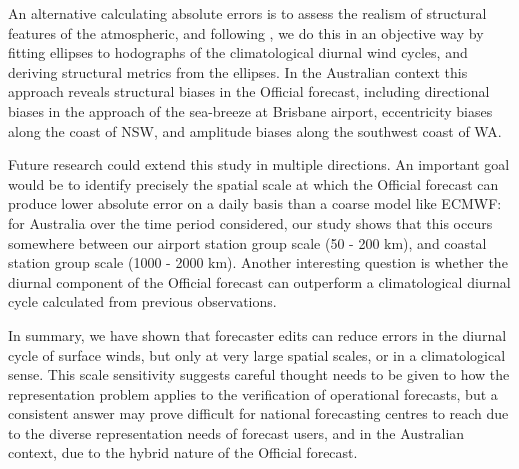 \documentclass{ametsoc}
\begin{document}
An alternative calculating absolute errors is to assess the realism of structural features of the atmospheric, and following \citet{gille05}, we do this in an objective way by fitting ellipses to hodographs of the climatological diurnal wind cycles, and deriving structural metrics from the ellipses. In the Australian context this approach reveals structural biases in the Official forecast, including directional biases in the approach of the sea-breeze at Brisbane airport, eccentricity biases along the coast of NSW, and amplitude biases along the southwest coast of WA.  

Future research could extend this study in multiple directions. An important goal would be to identify precisely the spatial scale at which the Official forecast can produce lower absolute error on a daily basis than a coarse model like ECMWF: for Australia over the time period considered, our study shows that this occurs somewhere between our airport station group scale (50 - 200 km), and coastal station group scale (1000 - 2000 km). Another interesting question is whether the diurnal component of the Official forecast can outperform a climatological diurnal cycle calculated from previous observations. 

In summary, we have shown that forecaster edits can reduce errors in the diurnal cycle of surface winds, but only at very large spatial scales, or in a climatological sense. This scale sensitivity suggests careful thought needs to be given to how the representation problem applies to the verification of operational forecasts, but a consistent answer may prove difficult for national forecasting centres to reach due to the diverse representation needs of forecast users, and in the Australian context, due to the hybrid nature of the Official forecast.



\end{document}
